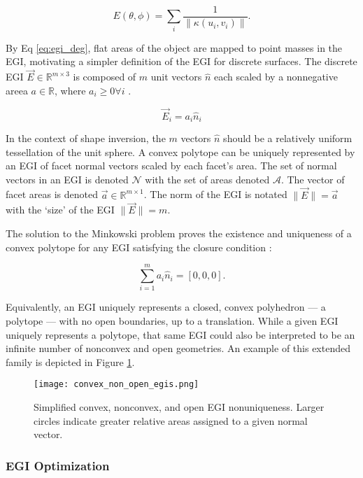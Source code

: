 \begin{equation} \label{eq:egi_deg}
  E(\theta, \phi) = \sum_i{\frac{1}{\| \kappa(u_i, v_i) \|}}.
\end{equation}

By Eq \ref{eq:egi_deg}, flat areas of the object are mapped to point masses in the EGI, motivating a simpler definition of the EGI for discrete surfaces. The discrete EGI $\vec{E} \in \mathbb{R}^{m \times 3}$ is composed of $m$ unit vectors $\hat{n}$ each scaled by a nonnegative areea $a \in \mathbb{R}$, where $a_i \geq 0 \forall i$ \cite{little1983}.

\begin{equation}
  \vec{E}_i = a_i \hat{n}_i
\end{equation}

In the context of shape inversion, the $m$ vectors $\hat{n}$ should be a relatively uniform tessellation of the unit sphere. A convex polytope can be uniquely represented by an EGI of facet normal vectors scaled by each facet's area. The set of normal vectors in an EGI is denoted $\mathcal{N}$ with the set of areas denoted $\mathcal{A}$. The vector of facet areas is denoted $\vec{a} \in \mathbb{R}^{m \times 1}$. The norm of the EGI is notated $\| \vec{E} \| = \vec{a}$ with the `size' of the EGI $\|\vec{E}\| = m$.

The solution to the Minkowski problem proves the existence and uniqueness of a convex polytope for any EGI satisfying the closure condition \cite{minkowski1909}:

\begin{equation} \label{eq:egi_closure}
  \sum_{i=1}^m a_i \hat{n}_i = [0, 0, 0].
\end{equation}

Equivalently, an EGI uniquely represents a closed, convex polyhedron --- a polytope --- with no open boundaries, up to a translation. While a given EGI uniquely represents a polytope, that same EGI could also be interpreted to be an infinite number of nonconvex and open geometries. An example of this extended family is depicted in Figure \ref{fig:egi_family}.

\begin{figure}[!htb]
  \centering
  \texttt{[image: convex\_non\_open\_egis.png]}
  \caption{Simplified convex, nonconvex, and open EGI nonuniqueness. Larger circles indicate greater relative areas assigned to a given normal vector.}
  \label{fig:egi_family}
\end{figure}

\subsubsection{EGI Optimization}


